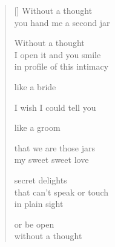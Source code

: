 \documentclass[11pt,a4paper]{article}
\begin{document}
\thispagestyle{empty}

\poemtitle{}

\settowidth{\versewidth}{You hand me a second jar}

\bigskip

\begin{verse}[\versewidth]
  Without a thought \\
  you hand me a second jar

  Without a thought \\
  I open it and you smile \\
  in profile of this intimacy

  like a bride

  I wish I could tell you

  like a groom

  that we are those jars \\
  my sweet sweet love

  secret delights \\
  that can't speak or touch \\
  in plain sight

  or be open \\
  without a thought
\end{verse}
\end{document}
